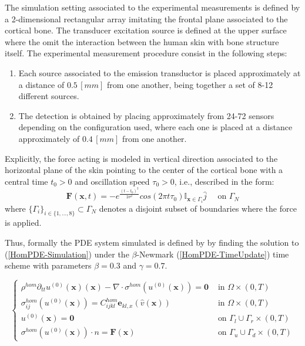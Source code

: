 The simulation setting associated to the experimental measurements is defined by a 2-dimensional rectangular array imitating the frontal plane associated to the cortical bone. The transducer excitation source is defined at the upper surface where the omit the interaction between the human skin with bone structure itself. 
The experimental measurement procedure consist in the following steps:
\begin{enumerate}
    \item Each source associated to the emission transductor is placed approximately at a distance of $0.5 \, [mm]$ from one another, being together a set of 8-12 different sources. 
    \item The detection is obtained by placing approximately from 24-72 sensors depending on the configuration used, where each one is placed at a distance approximately of $0.4 \, [mm]$ from one another.
\end{enumerate}
Explicitly, the force acting is modeled in vertical direction associated to the horizontal plane of the skin pointing to the center of the cortical bone with a central time $t_0 > 0$ and oscillation speed $\tau_0 > 0$, i.e., described in the form:
\begin{equation}
    \label{Force-eq}
    \mathbf{F}(\mathbf{x},t) = - e^{\frac{(t-t_0)^2}{2\sigma^2}} cos( 2 \pi t \tau_0 ) \mathbb{I}_{\mathbf{x} \in \Gamma_i} \hat{j} \quad \text{ on } \Gamma_N
\end{equation}
where $\{ \Gamma_i\}_{ i \in \{1,\dots, 8\}} \subset \Gamma_N$ denotes a disjoint subset of boundaries where the force is applied. 

Thus, formally the PDE system simulated is defined by
by finding the solution to (\ref{HomPDE-Simulation}) under the $\beta$-Newmark (\ref{HomPDE-TimeUpdate}) time scheme with parameters $\beta = 0.3$ and $\gamma = 0.7$.

\begin{equation}
    \label{HomPDE-Simulation}
    \left \{
    \begin{array}{cc}
        \rho^{hom} \partial_{tt} u^{(0)}(\mathbf{x}) (\mathbf{x}) - \nabla \cdot \sigma^{hom} (u^{(0)}(\mathbf{x}) ) = \mathbf{0} & \text{ in } \Omega \times(0,T) \\
        \sigma^{hom}_{ij}(u^{(0)}(\mathbf{x})) = C^{hom}_{ijkl}\mathbf{e}_{kl,x}(\hat{v}(\mathbf{x})) & \text{ in } \Omega\times(0,T) \\
        u^{(0)}(\mathbf{x}) = \mathbf{0} & \text{ on } \Gamma_l \cup \Gamma_r \times(0,T) \\
        \sigma^{hom}(u^{(0)}(\mathbf{x})) \cdot n = \mathbf{F}(\mathbf{x}) & \text{ on } \Gamma_u \cup \Gamma_d \times (0,T)
    \end{array}
    \right .
\end{equation}

